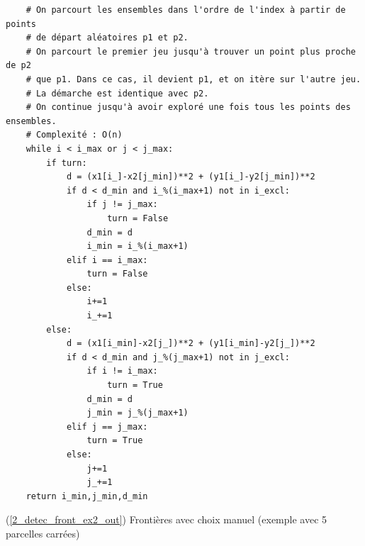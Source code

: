 \documentclass[12pt]{article}
\begin{document}
\begin{lstlisting}
    # On parcourt les ensembles dans l'ordre de l'index à partir de points 
    # de départ aléatoires p1 et p2.
    # On parcourt le premier jeu jusqu'à trouver un point plus proche de p2 
    # que p1. Dans ce cas, il devient p1, et on itère sur l'autre jeu.
    # La démarche est identique avec p2.
    # On continue jusqu'à avoir exploré une fois tous les points des ensembles.
    # Complexité : O(n)
    while i < i_max or j < j_max:
        if turn:
            d = (x1[i_]-x2[j_min])**2 + (y1[i_]-y2[j_min])**2
            if d < d_min and i_%(i_max+1) not in i_excl:
                if j != j_max:
                    turn = False
                d_min = d
                i_min = i_%(i_max+1)
            elif i == i_max:
                turn = False
            else:
                i+=1
                i_+=1
        else:
            d = (x1[i_min]-x2[j_])**2 + (y1[i_min]-y2[j_])**2
            if d < d_min and j_%(j_max+1) not in j_excl:
                if i != i_max:
                    turn = True
                d_min = d
                j_min = j_%(j_max+1)
            elif j == j_max:
                turn = True
            else:
                j+=1
                j_+=1
    return i_min,j_min,d_min\end{lstlisting}

\newpage
    \label{2_detec_front_ex2_in} (\ref{2_detec_front_ex2_out}) Frontières avec choix manuel (exemple avec 5 parcelles carrées)
\end{document}
